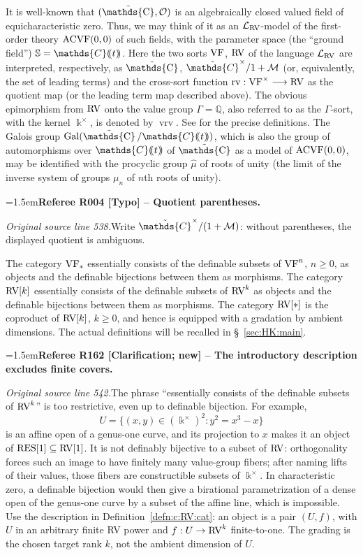 \documentclass[12pt]{amsart}
\newcommand{\RefereeRemark}[4]{%
  \par\medskip\begingroup\normalfont\small\color{RefereePurple}%
  \emergencystretch=1.5em\noindent\textbf{Referee R#1 [#2] -- #3.}\par\nobreak\noindent #4\par
  \endgroup\medskip
}
\theoremstyle{plain}
\theoremstyle{definition}
\theoremstyle{remark}
\numberwithin{equation}{section}
\theoremstyle{plain}
\newcommand{\VF}{\textup{VF}}
\newcommand{\ACVF}{\textup{ACVF}}
\newcommand{\RV}{\textup{RV}}
\newcommand{\MM}{\mdl M}
\newcommand{\OO}{\mdl O}
\DeclareMathOperator{\K}{\mathds{k}}
\newcommand{\C}{\mathds{C}}
\newcommand{\Q}{\mathds{Q}}
\newcommand{\0}{\emptyset}
\newcommand{\dpar}[1]{%
   (\mkern-4mu (#1 )\mkern-4mu )}
\newcommand{\lan}[3]{\mathcal{L}_{#1 \textup{#2} #3}}
\newcommand{\mdl}[1]{\mathcal{#1}}  %
\newcommand{\bb}[1]{\mathbb{#1}}
\newcommand{\fun}{\longrightarrow}
\newcommand{\RES}{\textup{RES}}
\DeclareMathOperator{\rv}{rv}
\DeclareMathOperator{\vrv}{vrv}
\DeclareMathOperator{\gal}{Gal}
\DeclareMathOperator{\puC}{\tilde \C}
\begin{document}
It is well-known that $(\puC, \OO)$ is an algebraically closed valued field of equicharacteristic zero. Thus, we may  think of it as an $\lan{}{RV}{}$-model of the first-order theory $\ACVF(0,0)$ of such fields, with the parameter space (the ``ground field'') $\bb S = \C \dpar t$.  Here  the two sorts $\VF$, $\RV$ of the language $\lan{}{RV}{}$ are  interpreted, respectively, as $\puC$, $\tilde \C^\times / 1 + \MM$ (or, equivalently, the set of leading terms) and the cross-sort function $\rv : \VF^\times \fun \RV$ as the quotient map (or the leading term map described above). The obvious epimorphism from $\RV$ onto the value group $\Gamma = \Q$, also referred to as the $\Gamma$-sort, with the kernel $\K^\times$, is denoted by $\vrv$. See \cite[\S~2]{Yin:special:trans} for the precise definitions. The Galois group $\gal(\puC / \C \dpar t)$, which  is also the group of automorphisms over $\C \dpar t$ of $\puC$ as a model of $\ACVF(0,0)$, may be identified with the procyclic group $\hat \mu$ of roots of unity (the limit of the inverse system of groups $\mu_n$ of $n$th roots of unity).

\RefereeRemark{004}{Typo}{Quotient parentheses}{%
\textit{Original source line 538.}\quad Write $\tilde\C^{\times}/(1+\MM)$: without parentheses, the displayed quotient is ambiguous.
}



The category $\VF_*$ essentially consists of the definable subsets of $\VF^n$, $n \geq 0$, as objects and the definable bijections between them as morphisms. The category $\RV[k]$ essentially consists of the definable subsets of $\RV^k$ as objects and the definable bijections between them as morphisms. The category  $\RV[*]$  is the coproduct of $\RV[k]$, $k \geq 0$, and hence is equipped with a gradation by ambient dimensions. The actual definitions will be recalled in \S~\ref{sec:HK:main}.

\RefereeRemark{162}{Clarification; new}{The introductory description excludes finite covers}{%
\textit{Original source line 542.}\quad The phrase ``essentially consists of the definable subsets of $\RV^k$'' is too restrictive, even up to definable bijection. For example,
\[
U=\{(x,y)\in(\K^\times)^2:y^2=x^3-x\}
\]
is an affine open of a genus-one curve, and its projection to $x$ makes it an object of $\RES[1]\subseteq\RV[1]$. It is not definably bijective to a subset of $\RV$: orthogonality forces such an image to have finitely many value-group fibers; after naming lifts of their values, those fibers are constructible subsets of $\K^\times$. In characteristic zero, a definable bijection would then give a birational parametrization of a dense open of the genus-one curve by a subset of the affine line, which is impossible. Use the description in Definition~\ref{defn:c:RV:cat}: an object is a pair $(U,f)$, with $U$ in an arbitrary finite RV power and $f:U\to\RV^k$ finite-to-one. The grading is the chosen target rank $k$, not the ambient dimension of $U$.
}
\end{document}
